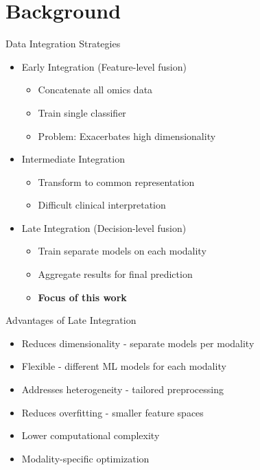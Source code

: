 \documentclass{beamer}
\begin{document}
\section{Background}

\begin{frame}{Data Integration Strategies}
\begin{itemize}
\item \alert{Early Integration} (Feature-level fusion)
  \begin{itemize}
  \item Concatenate all omics data
  \item Train single classifier
  \item Problem: Exacerbates high dimensionality
  \end{itemize}
\item \alert{Intermediate Integration}
  \begin{itemize}
  \item Transform to common representation
  \item Difficult clinical interpretation
  \end{itemize}
\item \alert{Late Integration} (Decision-level fusion)
  \begin{itemize}
  \item Train separate models on each modality
  \item Aggregate results for final prediction
  \item \textbf{Focus of this work}
  \end{itemize}
\end{itemize}
\end{frame}

\begin{frame}{Advantages of Late Integration}
\begin{itemize}[<+->]
\item \alert{Reduces dimensionality} - separate models per modality
\item \alert{Flexible} - different ML models for each modality
\item \alert{Addresses heterogeneity} - tailored preprocessing
\item \alert{Reduces overfitting} - smaller feature spaces
\item \alert{Lower computational complexity}
\item \alert{Modality-specific optimization}
\end{itemize}
\end{frame}
\end{document}
